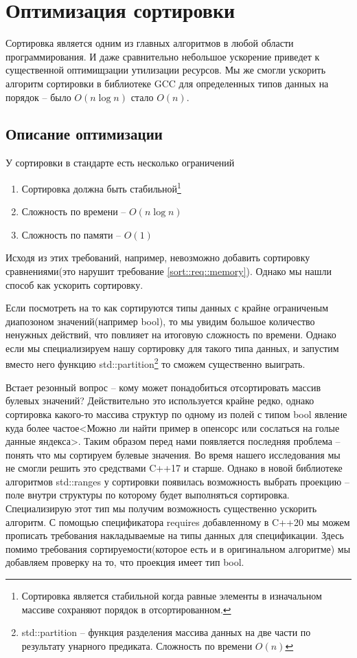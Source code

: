 \section{Оптимизация сортировки}\label{sort}
\par{Сортировка является одним из главных алгоритмов в любой области программирования. И даже сравнительно небольшое ускорение приведет к существенной оптимищзации утилизации ресурсов. Мы же смогли ускорить алгоритм сортировки в библиотеке GCC для определенных типов данных на порядок -- было $O(n\log n)$ стало $O(n)$. }
\subsection{Описание оптимизации}
\par{У сортировки в стандарте есть несколько ограничений
\begin{enumerate}
    \item{Сортировка должна быть стабильной\footnote{Сортировка является стабильной когда равные элементы в изначальном массиве сохраняют порядок в отсортированном.}}
    \item{Сложность по времени -- $O(n\log n)$}
    \item{Сложность по памяти -- $O(1)$}\label{sort::req::memory}
\end{enumerate}
Исходя из этих требований, например, невозможно добавить сортировку сравнениями(это нарушит требование \ref{sort::req::memory}). Однако мы нашли способ как ускорить сортировку.}
\par{Если посмотреть на то как сортируются типы данных с крайне ограниченым диапозоном значений(например bool), то мы увидим большое количество ненужных действий, что повлияет на итоговую сложность по времени. Однако если мы специализируем нашу сортировку для такого типа данных, и запустим вместо него функцию std::partition\footnote{std::partition -- функция разделения массива данных на две части по результату унарного предиката. Сложность по времени $O(n)$} то сможем существенно выиграть.}
\par{Встает резонный вопрос -- кому может понадобиться отсортировать массив булевых значений? Действительно это используется крайне редко, однако сортировка какого-то массива структур по одному из полей с типом bool явление куда более частое<Можно ли найти пример в опенсорс или сослаться на голые данные яндекса>. Таким образом перед нами появляется последняя проблема -- понять что мы сортируем булевые значения. Во время нашего исследования мы не смогли решить это средствами C++17 и старше. Однако в новой библиотеке алгоритмов std::ranges у сортировки появилась возможность выбрать проекцию -- поле внутри структуры по которому будет выполняться сортировка. Специализирую этот тип мы получим возможность существенно ускорить алгоритм. С помощью спецификатора requires добавленному в C++20 мы можем прописать требования накладываемые на типы данных для спецификации. Здесь помимо требования сортируемости(которое есть и в оригинальном алгоритме) мы добавляем проверку на то, что проекция имеет тип bool.}

